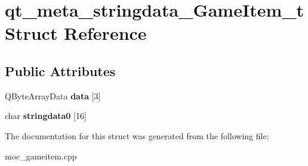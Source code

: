 \hypertarget{structqt__meta__stringdata__GameItem__t}{\section{qt\-\_\-meta\-\_\-stringdata\-\_\-\-Game\-Item\-\_\-t Struct Reference}
\label{structqt__meta__stringdata__GameItem__t}
}
\subsection*{Public Attributes}
\begin{DoxyCompactItemize}
\item 
\hypertarget{structqt__meta__stringdata__GameItem__t_a6d899d168e51660ea57dd55d93245086}{Q\-Byte\-Array\-Data {\bfseries data} \mbox{[}3\mbox{]}}\label{structqt__meta__stringdata__GameItem__t_a6d899d168e51660ea57dd55d93245086}

\item 
\hypertarget{structqt__meta__stringdata__GameItem__t_a80061230554b89670ec7e225fd325b55}{char {\bfseries stringdata0} \mbox{[}16\mbox{]}}\label{structqt__meta__stringdata__GameItem__t_a80061230554b89670ec7e225fd325b55}

\end{DoxyCompactItemize}


The documentation for this struct was generated from the following file\-:\begin{DoxyCompactItemize}
\item 
moc\-\_\-gameitem.\-cpp\end{DoxyCompactItemize}
